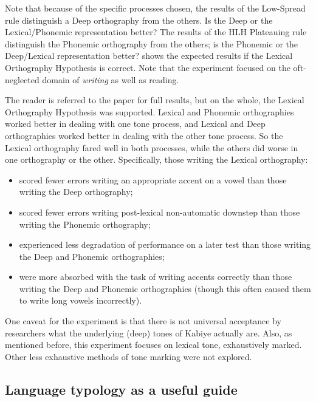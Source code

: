 \documentclass[output=paper]{langscibook}
\begin{document}
Note that because of the specific processes chosen, the results of the Low-Spread rule distinguish a Deep orthography from the others. Is the Deep or the Lexical/Phonemic representation better? The results of the HLH Plateauing rule distinguish the Phonemic orthography from the others; is the Phonemic or the Deep/Lexical representation better?  shows the expected results if the Lexical Orthography Hypothesis is correct. Note that the experiment focused on the oft-neglected domain of \textit{writing} as well as reading.



The reader is referred to the paper for full results, but on the whole, the Lexical Orthography Hypothesis was supported. Lexical and Phonemic orthographies worked better in dealing with one tone process, and Lexical and Deep orthographies worked better in dealing with the other tone process. So the Lexical orthography fared well in both processes, while the others did worse in one orthography or the other. Specifically, those writing the Lexical orthography:

\begin{itemize}
    \item scored fewer errors writing an appropriate accent on a vowel than those writing the Deep orthography;
    \item scored fewer errors writing post-lexical non-automatic downstep than those writing the Phonemic orthography;
    \item experienced less degradation of performance on a later test than those writing the Deep and Phonemic orthographies;
    \item were more absorbed with the task of writing accents correctly than those writing the Deep and Phonemic orthographies (though this often caused them to write long vowels incorrectly).
\end{itemize}

One caveat for the experiment is that there is not universal acceptance by researchers what the underlying (deep) tones of Kabiye actually are. Also, as mentioned before, this experiment focuses on lexical tone, exhaustively marked. Other less exhaustive methods of tone marking were not explored.

\subsection{Language typology as a useful guide}
\label{sec:PhonTheoryOrtho:LanguageTypo:2}
\end{document}
